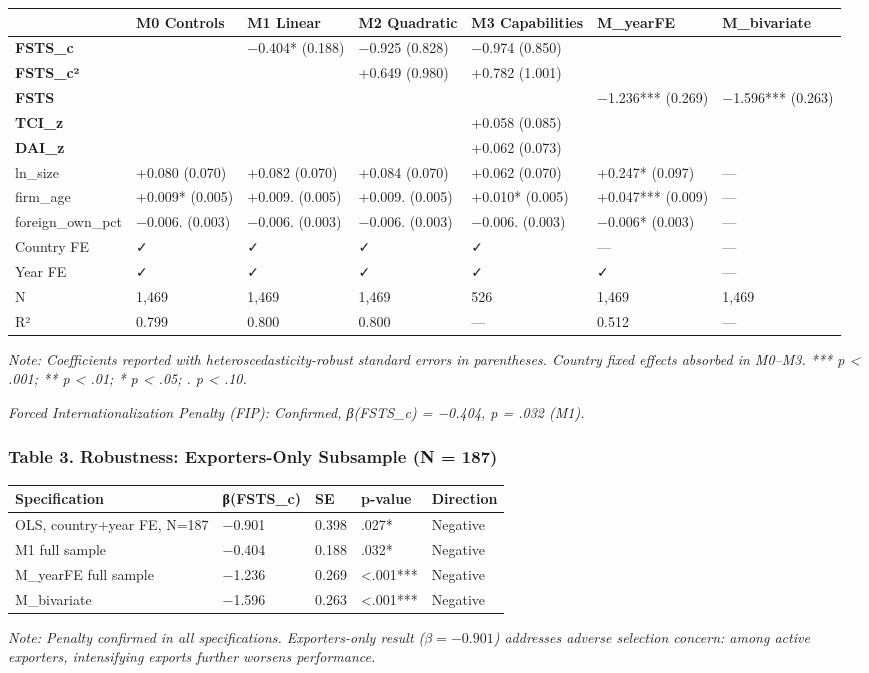 \documentclass[12pt,a4paper]{article}
\begin{document}
\begin{longtable}[]{@{}lllllll@{}}
\toprule\noalign{}
& M0 Controls & M1 Linear & M2 Quadratic & M3 Capabilities & M\_yearFE &
M\_bivariate \\
\midrule\noalign{}
\endhead
\bottomrule\noalign{}
\endlastfoot
\textbf{FSTS\_c} & & −0.404* (0.188) & −0.925 (0.828) & −0.974 (0.850) &
& \\
\textbf{FSTS\_c²} & & & +0.649 (0.980) & +0.782 (1.001) & & \\
\textbf{FSTS} & & & & & −1.236*** (0.269) & −1.596*** (0.263) \\
\textbf{TCI\_z} & & & & +0.058 (0.085) & & \\
\textbf{DAI\_z} & & & & +0.062 (0.073) & & \\
ln\_size & +0.080 (0.070) & +0.082 (0.070) & +0.084 (0.070) & +0.062
(0.070) & +0.247* (0.097) & --- \\
firm\_age & +0.009* (0.005) & +0.009. (0.005) & +0.009. (0.005) &
+0.010* (0.005) & +0.047*** (0.009) & --- \\
foreign\_own\_pct & −0.006. (0.003) & −0.006. (0.003) & −0.006. (0.003)
& −0.006. (0.003) & −0.006* (0.003) & --- \\
Country FE & ✓ & ✓ & ✓ & ✓ & --- & --- \\
Year FE & ✓ & ✓ & ✓ & ✓ & ✓ & --- \\
N & 1,469 & 1,469 & 1,469 & 526 & 1,469 & 1,469 \\
R² & 0.799 & 0.800 & 0.800 & --- & 0.512 & --- \\
\end{longtable}

\emph{Note: Coefficients reported with heteroscedasticity-robust
standard errors in parentheses. Country fixed effects absorbed in
M0--M3. *** p \textless{} .001; ** p \textless{} .01; * p \textless{}
.05; . p \textless{} .10.}

\emph{Forced Internationalization Penalty (FIP): Confirmed, β(FSTS\_c) =
−0.404, p = .032 (M1).}

\hypertarget{table-3-robustness-exporters-only-subsample-n--187}{%
\subsubsection{Table 3. Robustness: Exporters-Only Subsample (N =
187)}\label{table-3-robustness-exporters-only-subsample-n--187}}

\begin{longtable}[]{@{}lllll@{}}
\toprule\noalign{}
Specification & β(FSTS\_c) & SE & p-value & Direction \\
\midrule\noalign{}
\endhead
\bottomrule\noalign{}
\endlastfoot
OLS, country+year FE, N=187 & −0.901 & 0.398 & .027* & Negative \\
M1 full sample & −0.404 & 0.188 & .032* & Negative \\
M\_yearFE full sample & −1.236 & 0.269 & \textless.001*** & Negative \\
M\_bivariate & −1.596 & 0.263 & \textless.001*** & Negative \\
\end{longtable}

\emph{Note: Penalty confirmed in all specifications. Exporters-only
result (\(\beta = −0.901\)) addresses adverse selection concern: among
active exporters, intensifying exports further worsens performance.}
\end{document}
